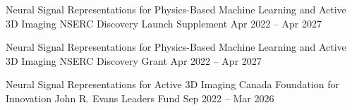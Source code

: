 \cventry[0.5em]{}
{Neural Signal Representations for Physics-Based Machine Learning and Active 3D Imaging}
{NSERC Discovery Launch Supplement}
{\hspace{-1em}Apr 2022 -- Apr 2027}
{}
{}

\cventry[0.5em]{}
{Neural Signal Representations for Physics-Based Machine Learning and Active 3D Imaging}
{NSERC Discovery Grant}
{\hspace{-1em}Apr 2022 -- Apr 2027}
{}
{}

\cventry[0.5em]{}
{Neural Signal Representations for Active 3D Imaging}
{Canada Foundation for Innovation John R. Evans Leaders Fund}
{Sep 2022 -- Mar 2026}
{}
{}

\endgroup
\endinput
